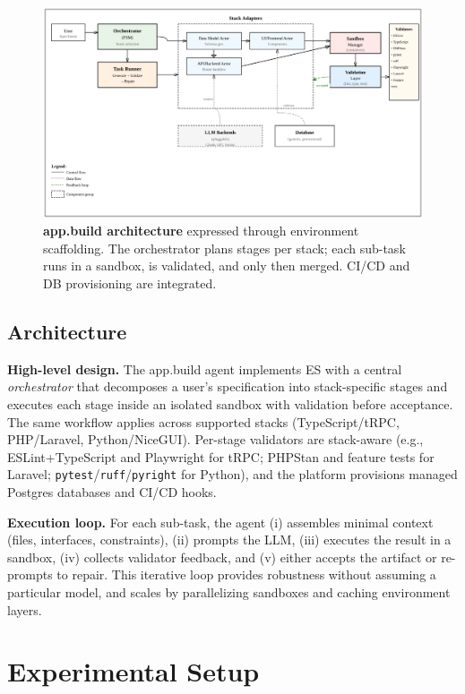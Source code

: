 \documentclass[11pt]{article}
\begin{document}
\begin{figure}[t]
  \centering
  \includegraphics[width=\linewidth]{diagrams/appbuild-arch.png}
  \caption{\textbf{app.build architecture} expressed through environment scaffolding. The orchestrator plans stages per stack; each sub-task runs in a sandbox, is validated, and only then merged. CI/CD and DB provisioning are integrated.}
  \label{fig:appbuild-arch}
\end{figure}

\subsection{Architecture}

\textbf{High-level design.} The app.build agent implements ES with a central \emph{orchestrator} that decomposes a user's specification into stack-specific stages and executes each stage inside an isolated sandbox with validation before acceptance. The same workflow applies across supported stacks (TypeScript/tRPC, PHP/Laravel, Python/NiceGUI). Per-stage validators are stack-aware (e.g., ESLint+TypeScript and Playwright for tRPC; PHPStan and feature tests for Laravel; \texttt{pytest}/\texttt{ruff}/\texttt{pyright} for Python), and the platform provisions managed Postgres databases and CI/CD hooks.

\textbf{Execution loop.} For each sub-task, the agent (i) assembles minimal context (files, interfaces, constraints), (ii) prompts the LLM, (iii) executes the result in a sandbox, (iv) collects validator feedback, and (v) either accepts the artifact or re-prompts to repair. This iterative loop provides robustness without assuming a particular model, and scales by parallelizing sandboxes and caching environment layers.

\section{Experimental Setup}
\label{sec:experimental-setup}
\end{document}

